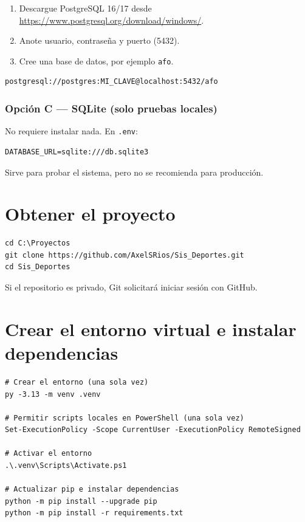 \documentclass[11pt,a4paper]{article}
\newcommand{\campo}[1]{\texttt{\small #1}}
\begin{document}
\begin{enumerate}[leftmargin=1.4em]
  \item Descargue PostgreSQL 16/17 desde
        \url{https://www.postgresql.org/download/windows/}.
  \item Anote usuario, contraseña y puerto (5432).
  \item Cree una base de datos, por ejemplo \campo{afo}.
\end{enumerate}

\begin{lstlisting}
postgresql://postgres:MI_CLAVE@localhost:5432/afo
\end{lstlisting}

\subsubsection{Opción C --- SQLite (solo pruebas locales)}

No requiere instalar nada. En \campo{.env}:

\begin{lstlisting}
DATABASE_URL=sqlite:///db.sqlite3
\end{lstlisting}

Sirve para probar el sistema, pero no se recomienda para producción.

\section{Obtener el proyecto}

\begin{lstlisting}
cd C:\Proyectos
git clone https://github.com/AxelSRios/Sis_Deportes.git
cd Sis_Deportes
\end{lstlisting}

Si el repositorio es privado, Git solicitará iniciar sesión con GitHub.

\section{Crear el entorno virtual e instalar dependencias}

\begin{lstlisting}
# Crear el entorno (una sola vez)
py -3.13 -m venv .venv

# Permitir scripts locales en PowerShell (una sola vez)
Set-ExecutionPolicy -Scope CurrentUser -ExecutionPolicy RemoteSigned

# Activar el entorno
.\.venv\Scripts\Activate.ps1

# Actualizar pip e instalar dependencias
python -m pip install --upgrade pip
python -m pip install -r requirements.txt
\end{lstlisting}
\end{document}
